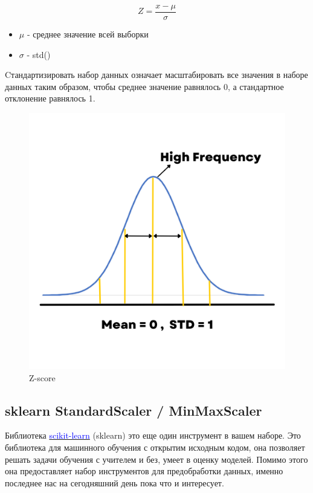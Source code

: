 \documentclass[12pt, a4paper]{article}
\begin{document}
{$$Z = \frac{x - \mu}{\sigma}$$

\begin{itemize}
    \item $\mu$ - среднее значение всей выборки
    \item $\sigma$ - std()
\end{itemize}

Cтандартизировать набор данных означает масштабировать 
все значения в наборе данных таким образом, чтобы 
среднее значение равнялось 0, а стандартное отклонение 
равнялось 1.

\begin{figure}[h]
    \begin{center}
        \includegraphics[scale=0.5,keepaspectratio]
        {Pictures/Picture_11.jpg}
        \caption{Z-score}
        \label{Picture_11}
    \end{center}
\end{figure}

\subsection{sklearn StandardScaler / MinMaxScaler}

Библиотека 
\href{https://scikit-learn.org/stable/index.html}
{\textcolor{blue}{scikit-learn}} (sklearn) 
это еще один инструмент в вашем наборе. 
Это библиотека для 
машинного обучения с открытим исходным кодом, 
она позволяет решать задачи обучения с учителем и 
без, умеет в оценку моделей. Помимо этого она 
предоставляет набор инструментов для предобработки 
данных, именно последнее нас на сегодняшний день 
пока что и интересует.

}
\end{document}
